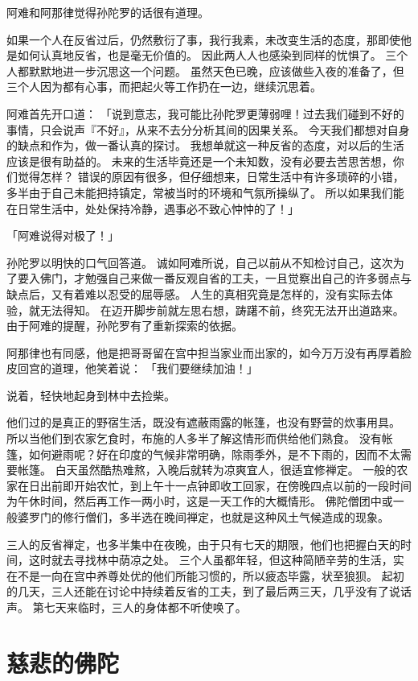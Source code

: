 \documentclass[twoside,openany]{book}
\begin{document}
阿难和阿那律觉得孙陀罗的话很有道理。

如果一个人在反省过后，仍然敷衍了事，我行我素，未改变生活的态度，那即使他是如何认真地反省，也是毫无价值的。
因此两人人也感染到同样的忧惧了。
三个人都默默地进一步沉思这一个问题。
虽然天色已晚，应该做些入夜的准备了，但三个人因为都有心事，而把起火等工作扔在一边，继续沉思着。

阿难首先开口道：
「说到意志，我可能比孙陀罗更薄弱哩！过去我们碰到不好的事情，只会说声『不好』，从来不去分分析其间的因果关系。
今天我们都想对自身的缺点和作为，做一番认真的探讨。
我想单就这一种反省的态度，对以后的生活应该是很有助益的。
未来的生活毕竟还是一个未知数，没有必要去苦思苦想，你们觉得怎样？
错误的原因有很多，但仔细想来，日常生活中有许多琐碎的小错，多半由于自己未能把持镇定，常被当时的环境和气氛所操纵了。
所以如果我们能在日常生活中，处处保持冷静，遇事必不致心忡忡的了！」

「阿难说得对极了！」

孙陀罗以明快的口气回答道。
诚如阿难所说，自己以前从不知检讨自己，这次为了要入佛门，才勉强自己来做一番反观自省的工夫，一且觉察出自己的许多弱点与缺点后，又有着难以忍受的屈辱感。
人生的真相究竟是怎样的，没有实际去体验，就无法得知。
在迈开脚步前就左思右想，踌躇不前，终究无法开出道路来。
由于阿难的提醒，孙陀罗有了重新探索的依据。

阿那律也有同感，他是把哥哥留在宫中担当家业而出家的，如今万万没有再厚着脸皮回宫的道理，他笑着说：
「我们要继续加油！」

说着，轻快地起身到林中去捡柴。

他们过的是真正的野宿生活，既没有遮蔽雨露的帐篷，也没有野营的炊事用具。
所以当他们到农家乞食时，布施的人多半了解这情形而供给他们熟食。
没有帐篷，如何避雨呢？好在印度的气候非常明确，除雨季外，是不下雨的，因而不太需要帐篷。
白天虽然酷热难熬，入晚后就转为凉爽宜人，很适宜修禅定。
一般的农家在日出前即开始农忙，到上午十一点钟即收工回家，在傍晚四点以前的一段时间为午休时间，然后再工作一两小时，这是一天工作的大概情形。
佛陀僧团中或一般婆罗门的修行僧们，多半选在晚间禅定，也就是这种风土气候造成的现象。

三人的反省禅定，也多半集中在夜晚，由于只有七天的期限，他们也把握白天的时间，这时就去寻找林中荫凉之处。
三个人虽都年轻，但这种简陋辛劳的生活，实在不是一向在宫中养尊处优的他们所能习惯的，所以疲态毕露，状至狼狈。
起初的几天，三人还能在讨论中持续着反省的工夫，到了最后两三天，几乎没有了说话声。
第七天来临时，三人的身体都不听使唤了。

\section{慈悲的佛陀}\label{sec9.2}
\end{document}
